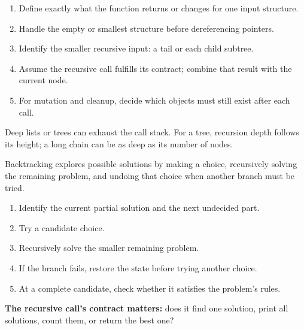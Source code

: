 \documentclass[11pt,a4paper]{article}
\providecommand{\tightlist}{\setlength{\itemsep}{0pt}\setlength{\parskip}{0pt}}
\begin{document}
\begin{enumerate}
\def\labelenumi{\arabic{enumi}.}
\tightlist
\item
  Define exactly what the function returns or changes for one input structure.
\item
  Handle the empty or smallest structure before dereferencing pointers.
\item
  Identify the smaller recursive input: a tail or each child subtree.
\item
  Assume the recursive call fulfills its contract; combine that result with the current node.
\item
  For mutation and cleanup, decide which objects must still exist after each call.
\end{enumerate}

Deep lists or trees can exhaust the call stack. For a tree, recursion depth follows its height; a long chain can be as deep as its number of nodes.

\label{l8.-problem-solving-techniques-recursive-backtracking-and-loop-invariants}
\hypertarget{l8.-problem-solving-techniques-recursive-backtracking-and-loop-invariants}{}

\label{recursive-backtracking}
\hypertarget{recursive-backtracking}{}

Backtracking explores possible solutions by making a choice, recursively solving the remaining problem, and undoing that choice when another branch must be tried.

\begin{enumerate}
\def\labelenumi{\arabic{enumi}.}
\tightlist
\item
  Identify the current partial solution and the next undecided part.
\item
  Try a candidate choice.
\item
  Recursively solve the smaller remaining problem.
\item
  If the branch fails, restore the state before trying another choice.
\item
  At a complete candidate, check whether it satisfies the problem's rules.
\end{enumerate}

\textbf{The recursive call's contract matters:} does it find one solution, print all solutions, count them, or return the best one?
\end{document}

